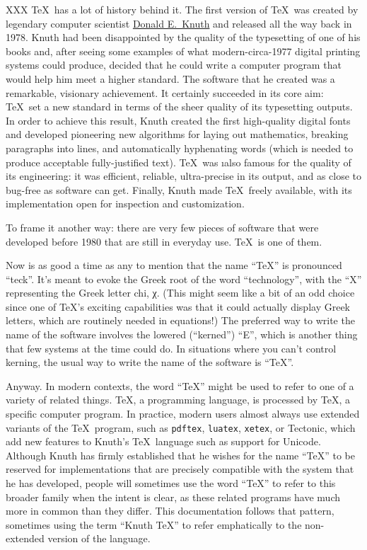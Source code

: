 XXX \TeX\ has a lot of history behind it. The first version of \TeX\ was created
by legendary computer scientist
\href{https://en.wikipedia.org/wiki/Donald_Knuth}{Donald E.\ Knuth} and released
all the way back in 1978. Knuth had been disappointed by the quality of the
typesetting of one of his books and, after seeing some examples of what
modern-circa-1977 digital printing systems could produce, decided that he could
write a computer program that would help him meet a higher standard. The
software that he created was a remarkable, visionary achievement. It certainly
succeeded in its core aim: \TeX\ set a new standard in terms of the sheer
quality of its typesetting outputs. In order to achieve this result, Knuth
created the first high-quality digital fonts and developed pioneering new
algorithms for laying out mathematics, breaking paragraphs into lines, and
automatically hyphenating words (which is needed to produce acceptable
fully-justified text). \TeX\ was \i{also} famous for the quality of its
engineering: it was efficient, reliable, ultra-precise in its output, and as
close to bug-free as software can get. Finally, Knuth made \TeX\ freely
available, with its implementation open for inspection and customization.

To frame it another way: there are very few pieces of software that were
developed before 1980 that are still in everyday use. \TeX\ is one of them.

Now is as good a time as any to mention that the name “\TeX” is pronounced
“teck”. It's meant to evoke the Greek root of the word “technology”, with the
“X” representing the Greek letter chi, χ. (This might seem like a bit of an odd
choice since one of \TeX's exciting capabilities was that it could actually
display Greek letters, which are routinely needed in equations!) The preferred
way to write the name of the software involves the lowered (“kerned”) “E”, which
is another thing that few systems at the time could do. In situations where you
can't control kerning, the usual way to write the name of the software is “TeX”.

Anyway. In modern contexts, the word “\TeX” might be used to refer to one of a
variety of related things. \TeX, a programming language, is processed by \TeX, a
specific computer program. In practice, modern users almost always use extended
variants of the \TeX\ program, such as \texttt{pdftex}, \texttt{luatex},
\texttt{xetex}, or Tectonic, which add new features to Knuth's \TeX\ language
such as support for Unicode. Although Knuth has firmly established that he
wishes for the name “\TeX” to be reserved for implementations that are precisely
compatible with the system that he has developed, people will sometimes use the
word “\TeX” to refer to this broader family when the intent is clear, as these
related programs have much more in common than they differ. This documentation
follows that pattern, sometimes using the term “Knuth \TeX” to refer
emphatically to the non-extended version of the language.


